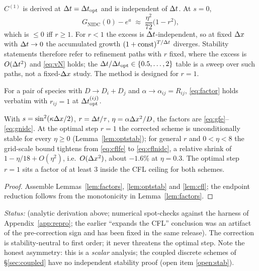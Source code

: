\begin{remark}\label{rem:scope}
$C^{(1)}$ is derived at $\Delta t=\Delta t_{\mathrm{opt}}$ and is independent of $\Delta t$. At $s=0$,
\[ G_{\mathrm{NIDC}}(0)-e^{a}\;\approx\;\frac{\eta^2}{72}\bigl(1-r^2\bigr),
\]
which is $\le0$ iff $r\ge 1$. For $r<1$ the excess is $\Delta t$-independent, so
at fixed $\Delta x$ with $\Delta t\to0$ the accumulated growth
$(1+\text{const})^{T/\Delta t}$ diverges. Stability statements therefore refer
to refinement paths with $r$ fixed, where the excess is $O(\Delta t^2)$ and
\eqref{eq:vN} holds; the $\Delta t/\Delta t_{\mathrm{opt}}\in\{0.5,\dots,2\}$ table is a sweep over
such paths, not a fixed-$\Delta x$ study. The method is designed for $r=1$.
\end{remark}

\begin{corollary}\label{cor:pair}
For a pair of species with $D\to D_i+D_j$ and
$\alpha\to\alpha_{ij}=R_{ij}$, \eqref{eq:factor} holds verbatim with
$r_{ij}=1$ at $\Delta t_{\mathrm{opt}}^{(ij)}$.
\end{corollary}

\begin{theorem}\label{prop:stability}
With $s=\sin^2(\kappa\Delta x/2)$, $r=\Delta t/\tau$, $\eta=\alpha\Delta x^2/D$, the
factors are \eqref{eq:gfe}--\eqref{eq:gnidc}. At the optimal step $r=1$ the
corrected scheme is unconditionally stable for every $\eta\ge0$
(Lemma~\ref{lem:optstab}); for general $r$ and $0<\eta<8$ the grid-scale
bound tightens from \eqref{eq:cflfe} to \eqref{eq:cflnidc}, a relative
shrink of $1-\eta/18+O(\eta^2)$, i.e.\ $O(\Delta x^2)$, about $-1.6\%$ at
$\eta=0.3$. The optimal step $r=1$ sits a factor of at least $3$ inside
the CFL ceiling for both schemes.
\end{theorem}

\begin{proof}
Assemble Lemmas~\ref{lem:factors}, \ref{lem:optstab} and \ref{lem:cfl};
the endpoint reduction follows from the monotonicity in
Lemma~\ref{lem:factors}.
\end{proof}

\noindent\emph{Status:} \tagV (analytic derivation above; numerical
spot-checks against the harness of Appendix~\ref{app:repro}; the earlier
``expands the CFL'' conclusion was an artifact of the pre-correction sign
and has been fixed in the same release). The correction is
stability-neutral to first order; it never threatens the optimal step.
Note the honest asymmetry: this is a \emph{scalar} analysis; the coupled
discrete schemes of \S\ref{sec:coupled} have no independent stability
proof (open item \ref{open:stab}).

